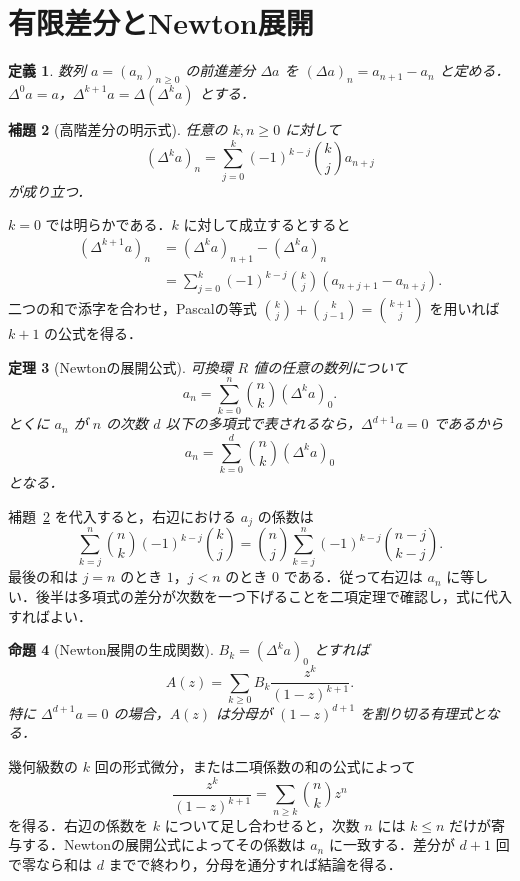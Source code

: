 \documentclass[a5paper,10pt,onecolumn]{jsarticle}
\makeatletter
\theoremstyle{mathnotetheorem}
\newtheorem{theorem}{定理}[section]
\newtheorem{definition}[theorem]{定義}
\newtheorem{lemma}[theorem]{補題}
\newtheorem{proposition}[theorem]{命題}
\renewcommand{\proofname}{証明}
\renewenvironment{proof}[1][\proofname]{%
  \par\pushQED{\qed}\normalfont\topsep4\p@\@plus2\p@\relax
  \trivlist\item[\hskip\labelsep\bfseries #1]\ignorespaces
}{\popQED\endtrivlist\@endpefalse}
\makeatother
\begin{document}
\section{有限差分とNewton展開}
\begin{definition}
数列 $a=(a_n)_{n\ge0}$ の前進差分 $\Delta a$ を
$(\Delta a)_n=a_{n+1}-a_n$ と定める．$\Delta^0a=a$，$\Delta^{k+1}a=\Delta(\Delta^ka)$ とする．
\end{definition}
\begin{lemma}[高階差分の明示式]\label{lem:finite-diff}
任意の $k,n\ge0$ に対して
\[
 (\Delta^ka)_n=\sum_{j=0}^{k}(-1)^{k-j}\binom kj a_{n+j}
\]
が成り立つ．
\end{lemma}
\begin{proof}
$k=0$ では明らかである．$k$ に対して成立するとすると
\begin{align*}
 (\Delta^{k+1}a)_n
 &= (\Delta^ka)_{n+1}-(\Delta^ka)_n\\
 &=\sum_{j=0}^{k}(-1)^{k-j}\binom kj(a_{n+j+1}-a_{n+j}).
\end{align*}
二つの和で添字を合わせ，Pascalの等式
$\binom kj+\binom k{j-1}=\binom{k+1}j$
を用いれば $k+1$ の公式を得る．
\end{proof}
\begin{theorem}[Newtonの展開公式]\label{thm:newton}
可換環 $R$ 値の任意の数列について
\[
 a_n=\sum_{k=0}^{n}\binom nk (\Delta^k a)_0.
 \tag{4}\label{eq:newton}
\]
とくに $a_n$ が $n$ の次数 $d$ 以下の多項式で表されるなら，$\Delta^{d+1}a=0$ であるから
\[
 a_n=\sum_{k=0}^{d}\binom nk (\Delta^ka)_0
\]
となる．
\end{theorem}
\begin{proof}
補題~\ref{lem:finite-diff} を代入すると，右辺における $a_j$ の係数は
\[
 \sum_{k=j}^n\binom nk(-1)^{k-j}\binom kj
 =\binom nj\sum_{k=j}^n(-1)^{k-j}\binom{n-j}{k-j}.
\]
最後の和は $j=n$ のとき $1$，$j<n$ のとき $0$ である．従って右辺は $a_n$ に等しい．後半は多項式の差分が次数を一つ下げることを二項定理で確認し，式に代入すればよい．
\end{proof}
\begin{proposition}[Newton展開の生成関数]
$B_k=(\Delta^ka)_0$ とすれば
\[
 A(z)=\sum_{k\ge0}B_k\frac{z^k}{(1-z)^{k+1}}.
\]
特に $\Delta^{d+1}a=0$ の場合，$A(z)$ は分母が $(1-z)^{d+1}$ を割り切る有理式となる．
\end{proposition}
\begin{proof}
幾何級数の $k$ 回の形式微分，または二項係数の和の公式によって
\[
 \frac{z^k}{(1-z)^{k+1}}
 =\sum_{n\ge k}\binom nk z^n
\]
を得る．右辺の係数を $k$ について足し合わせると，次数 $n$ には $k\le n$ だけが寄与する．Newtonの展開公式によってその係数は $a_n$ に一致する．差分が $d+1$ 回で零なら和は $d$ までで終わり，分母を通分すれば結論を得る．
\end{proof}
\end{document}
